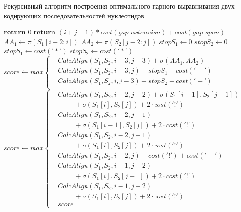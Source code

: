 \begin{algorithm}[H]
	\caption{Рекурсивный алгоритм построения оптимального парного выравнивания двух кодирующих последовательностей нуклеотидов} \label{lst:pairwise}
	\begin{algorithmic}
		 
			\State \textbf{return} $0$ 
		\EndIf
			\State \textbf{return} $(i+j-1)*cost(gap\_extension) + cost(gap\_open)$ 
		\EndIf
		\State $AA_1 \gets \pi(S_1[i-2:i])$ 
		\State $AA_2 \gets \pi(S_2[j-2:j])$
		\State $stopS_1 \gets 0$
		\State $stopS_2 \gets 0$ 
			\State $stopS_1 \gets cost('*')$ 
		\EndIf
			\State $stopS_2 \gets cost('*')$ 
		\EndIf {}
		\State $score \gets max\left\{
		\begin{aligned}
			& CalcAlign(S_1, S_2, i-3, j-3) + \sigma(AA_1, AA_2)\\
			& CalcAlign(S_1, S_2, i-3, j) + stopS_1 + cost('-')\\
			& CalcAlign(S_1, S_2, i, j-3) + stopS_2 + cost('-')\\
		\end{aligned}
		\right.$ 
		\Statex {}
		\State $score \gets max\left\{
		\begin{aligned}
			& CalcAlign(S_1, S_2, i-2, j-2) + \sigma(S_1[i-1], S_2[j-1]) \\ 
			& \hspace{1cm}+ \sigma(S_1[i], S_2[j]) + 2\cdot cost('!')\\
			& CalcAlign(S_1, S_2, i-2, j-1)\\
			& \hspace{1cm}+ \sigma(S_1[i-1], S_2[j]) + 2\cdot cost('!')\\
			& CalcAlign(S_1, S_2, i-2, j-1)\\
			& \hspace{1cm}+ \sigma(S_1[i], S_2[j]) + 2\cdot cost('!')\\
			& CalcAlign(S_1, S_2, i-2, j) + cost('!') + cost('-')\\
			& CalcAlign(S_1, S_2, i-1, j-2)\\
			& \hspace{1cm}+ \sigma(S_1[i], S_2[j-1]) + 2\cdot cost('!')\\
			& CalcAlign(S_1, S_2, i-1, j-2)\\
			& \hspace{1cm}+ \sigma(S_1[i], S_2[j]) + 2\cdot cost('!')\\
			& score
		\end{aligned}
		\right.$
	\end{algorithmic}
\end{algorithm}

